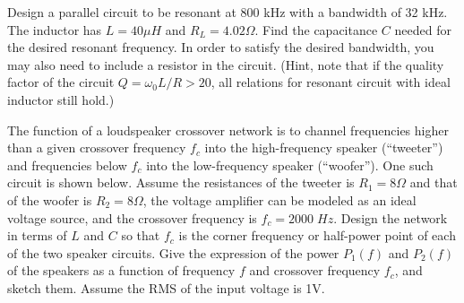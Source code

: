 \item Design a parallel circuit to be resonant at 800 kHz with a bandwidth
of 32 kHz. The inductor has $L=40 \mu H$ and $R_L=4.02 \Omega$. Find the
capacitance $C$ needed for the desired resonant frequency. In order to
satisfy the desired bandwidth, you may also need to include a resistor 
in the circuit. (Hint, note that if the quality factor of the circuit
$Q=\omega_0 L/R > 20$, all relations for resonant circuit with ideal
inductor still hold.)



\item The function of a loudspeaker crossover network is to channel 
frequencies higher than a given crossover frequency $f_c$ into the
high-frequency speaker (``tweeter'') and frequencies below $f_c$ into
the low-frequency speaker (``woofer''). One such circuit is shown below.
Assume the resistances of the tweeter is $R_1=8\Omega$ and that of the 
woofer is $R_2=8\Omega$, the voltage amplifier can be modeled as an
ideal voltage source, and the crossover frequency is $f_c=2000\; Hz$.
Design the network in terms of $L$ and $C$ so that $f_c$ is the corner
frequency or half-power point of each of the two speaker circuits. Give 
the expression of the power $P_1(f)$ and $P_2(f)$ of the speakers as a 
function of frequency $f$ and crossover frequency $f_c$, and sketch them.
Assume the RMS of the input voltage is 1V.


% 


